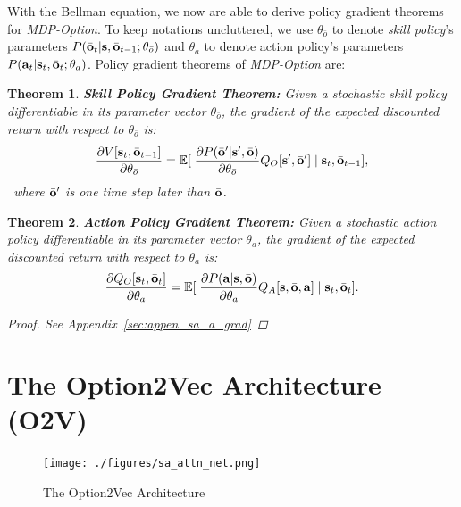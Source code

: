\documentclass{article}
\newtheorem{thm}{Theorem}[section]
\begin{document}
With the Bellman equation, we now are able to derive policy
gradient theorems for \emph{MDP-Option}. To keep notations uncluttered,
we use $\theta_{\bar{o}}$ to denote \emph{skill policy}'s
parameters
$P(\bar{{\mathbf{o}}}_{t}|{\mathbf{s}},\bar{{\mathbf{o}}}_{t-1};\theta_{\bar{o}})$ and
$\theta_a$ to denote action policy's parameters
$P({\mathbf{a}}_t|{\mathbf{s}}_t,\bar{{\mathbf{o}}}_t;\theta_a)$. Policy gradient
theorems of \emph{MDP-Option} are:
\begin{thm}
  \textbf{ Skill Policy Gradient Theorem: } Given a stochastic
  \emph{skill policy} differentiable in its parameter vector
  $\theta_{\bar{o}}$, the gradient of the expected discounted
  return with respect to $\theta_{\bar{o}}$ is:
  \begin{equation}
    \label{eq:sa_o_grad}
    \frac{\partial \bar{V}[{\mathbf{s}}_t,\bar{{\mathbf{o}}}_{t-1}]}{\partial \theta_{\bar{o}}}=\mathbb{E}[\;\frac{\partial P(\bar{{\mathbf{o}}}'|{\mathbf{s}}',\bar{{\mathbf{o}}})}{\partial \theta_{\bar{o}}}Q_O[{\mathbf{s}}',\bar{{\mathbf{o}}}']\;|\;{\mathbf{s}}_t,\bar{{\mathbf{o}}}_{t-1}],
  \end{equation}
  ~where $\bar{{\mathbf{o}}}'$ is one time step later than $\bar{{\mathbf{o}}}$.
\end{thm}
\begin{thm}
  \textbf{ Action Policy Gradient Theorem: } Given a stochastic action policy
  differentiable in its parameter vector $\theta_a$, the gradient
  of the expected discounted return with respect to $\theta_a$ is:
  \begin{equation}
    \label{eq:sa_a_grad}
      \frac{\partial Q_O[{\mathbf{s}}_t,\bar{{\mathbf{o}}}_t]}{ \partial \theta_a }=\mathbb{E}[\;\frac{\partial P({\mathbf{a}}|{\mathbf{s}},\bar{{\mathbf{o}}})}{\partial \theta_a}Q_A[ {\mathbf{s}},\bar{{\mathbf{o}}},{\mathbf{a}}]\; | \; {\mathbf{s}}_t,\bar{{\mathbf{o}}}_t].
  \end{equation}
 \vspace{-5mm} \begin{proof}
    See Appendix~\ref{sec:appen_sa_a_grad}
  \end{proof}\vspace{-3mm}
\end{thm}

\section{The Option2Vec Architecture (O2V)}
\label{sec:net_arch}
\begin{figure}
  \vspace{-4mm}
  \texttt{[image: ./figures/sa\_attn\_net.png]}
  \caption{\label{fig:sa_net} The Option2Vec Architecture}
  \vspace{-5mm}
\end{figure}
\end{document}
